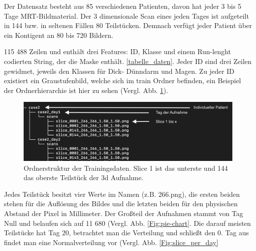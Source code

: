 Der Datensatz besteht aus 85 verschiedenen Patienten, davon hat jeder 3 bis 5 Tage MRT-Bildmaterial. Der 3 dimensionale Scan eines jeden Tages ist aufgeteilt in 144  bzw. in seltenen Fällen 80 Teilstücken. Demnach verfügt jeder Patient über ein Kontigent an 80 bis 720 Bildern.

115 488 Zeilen und enthält drei Features: ID, Klasse und einem Run-lenght codierten String, der die Maske enthält. \autoref{tabelle_daten}. Jeder ID sind drei Zeilen gewidmet, jeweils den Klassen für Dick- Dünndarm und Magen. Zu jeder ID existiert ein Graustufenbild, welche sich im train Ordner befinden, ein Beispiel der Ordnerhierarchie ist hier zu sehen (Vergl. Abb. \ref{Fig:train-data}).

\begin{figure}[H]
	\begin{center}
		\includegraphics[width=350pt]{bilder/data_tree}
		\caption{Ordnerstruktur der Trainingsdaten. Slice 1 ist das unterste und 144 das oberste Teilstück der 3d Aufnahme.}\label{Fig:train-data}
	\end{center}
\end{figure}

Jedes Teilstück besitzt vier Werte im Namen (z.B. 266.png), die ersten beiden stehen für die Auflösung des Bildes und die letzten beiden für den physischen Abstand der Pixel in Millimeter. Der Großteil der Aufnahmen stammt von Tag Null und belaufen sich auf 11 680 (Vergl. Abb. \ref{Fig:pie-chart}. Die darauf meisten Teilstücke hat Tag 20, betrachtet man die Verteilung und schließt den 0. Tag aus findet man eine Normalverteilung vor (Vergl. Abb. \ref{Fig:slice_per_day}

